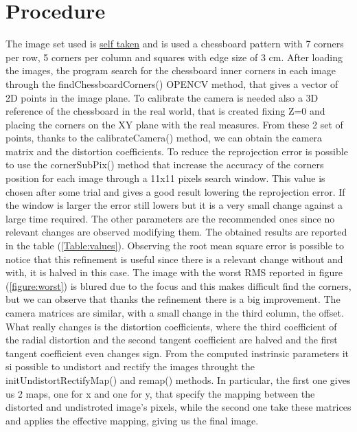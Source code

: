 \documentclass[11pt,a4paper]{article}
\newcommand{\cc}{\fontfamily{txtt}\selectfont}
\begin{document}
\section{Procedure}
The image set used is  \href{https://drive.google.com/file/d/1pfgG-me5uAq6LSIfivCutbsjdKhKwFRb/view?usp=sharing}{self taken} and is used a chessboard pattern with 7 corners per row, 5 corners per column and squares with edge size of 3 cm.
After loading the images, the program search for the chessboard inner corners in each image through the {\cc findChessboardCorners()} OPENCV method, that gives a vector of 2D points in the image plane.
To calibrate the camera is needed also a 3D reference of the chessboard in the real world, that is created fixing Z=0 and placing the corners on the XY plane with the real measures.
From these 2 set of points, thanks to the {\cc calibrateCamera()} method, we can obtain the camera matrix and the distortion coefficients. 
To reduce the reprojection error is possible to use the {\cc cornerSubPix()} method that increase the accuracy of the corners position for each image through a 11x11 pixels search window. 
This value is chosen after some trial and gives a good result lowering the reprojection error.
If the window is larger the error still lowers but it is a very small change against a large time required.
The other parameters are the recommended ones since no relevant changes are observed modifying them.\newline
The obtained results are reported in the table (\ref{Table:values}). 
Observing the root mean square error is possible to notice that this refinement is useful since there is a relevant change without and with, it is halved in this case.
The image with the worst RMS reported in figure (\ref{figure:worst}) is blured due to the focus and this makes difficult find the corners, but we can observe that thanks the refinement there is a big improvement.
The camera matrices are similar, with a small change in the third column, the offset.
What really changes is the distortion coefficients, where the third coefficient of the radial distortion and the second tangent coefficient are halved and the first tangent coefficient even changes sign.\newline
From the computed instrinsic parameters it si possible to undistort and rectify the images throught the {\cc initUndistortRectifyMap()} and {\cc remap()} methods.
In particular, the first one gives us 2 maps, one for x and one for y, that specify the mapping between the distorted and undistroted image's pixels, while the second one take these matrices and applies the effective mapping, giving us the final image.
\end{document}
